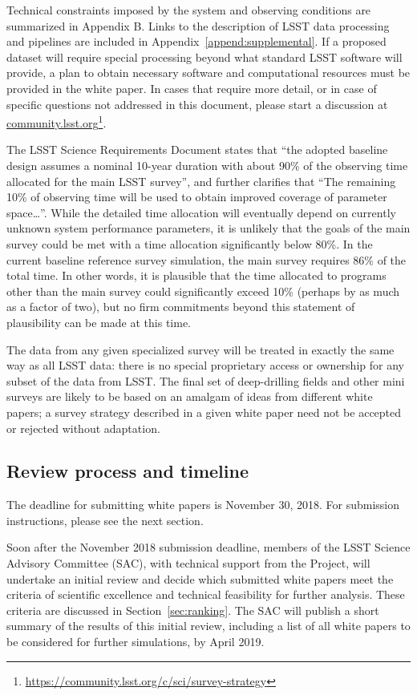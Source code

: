 \documentclass[DM,toc,usenatbib]{lsstdoc}
\begin{document}
Technical constraints imposed by the system and observing conditions are summarized in 
Appendix B. Links to the description of LSST data processing and pipelines are included in Appendix~\ref{append:supplemental}. If a proposed dataset will require special processing beyond 
what standard LSST software will provide, a plan to obtain necessary software and computational resources 
must be provided in the white paper. In cases that require more detail, or in case of specific questions not 
addressed in this document, please start a discussion at \href{http://community.lsst.org}{community.lsst.org}\footnote{\url{https://community.lsst.org/c/sci/survey-strategy}}.

The LSST Science Requirements Document states that ``the adopted baseline design assumes a 
nominal 10-year duration with about 90\% of the observing time allocated for the main LSST survey'',
and further clarifies that ``The remaining 10\% of observing time will be used to obtain improved 
coverage of parameter space\dots''. While the detailed time allocation will eventually depend on currently unknown system
performance parameters, it is unlikely that the goals of the main survey could be met with a time allocation
significantly below 80\%. In the current baseline reference survey simulation, the main survey requires 86\% of the total time.
In other words, it is plausible that the time allocated to programs other
than the main survey could significantly exceed 10\% (perhaps by as much as a factor of two), but 
no firm commitments beyond this statement of plausibility can be made at this time. 

The data from any given specialized survey will be treated in exactly the same way as all LSST 
data: there is no special proprietary access or ownership for any subset of the data from LSST. The final set of 
deep-drilling fields and other mini surveys are likely to be based on an amalgam of ideas from different 
white papers; a survey strategy described in a given white paper need not be accepted or rejected without adaptation.


\subsection{Review process and timeline}

The deadline for submitting white papers is November 30, 2018. For submission instructions, 
please see the next section. 

Soon after the November 2018 submission deadline, members of the LSST Science Advisory Committee (SAC), 
with technical support from the Project, 
will undertake an initial review and decide which submitted white papers meet the criteria of scientific excellence and 
technical feasibility for further analysis. These criteria are discussed in Section~\ref{sec:ranking}. The SAC will publish 
a short summary of the results of this initial review, including a list of all white papers to be considered for further 
simulations, by April 2019. 
\end{document}

